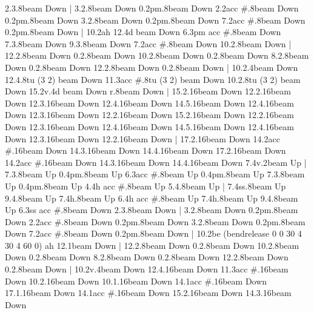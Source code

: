       2.3.8{beam Down}
    |
      3.2.8{beam Down}
      0.2{pm}.8{beam Down}
      2.2{acc #}.8{beam Down}
      0.2{pm}.8{beam Down}
      3.2.8{beam Down}
      0.2{pm}.8{beam Down}
      7.2{acc #}.8{beam Down}
      0.2{pm}.8{beam Down}
    |
      10.2{ah 12}.4{d beam Down}
      6.3{pm acc #}.8{beam Down}
      7.3.8{beam Down}
      9.3.8{beam Down}
      7.2{acc #}.8{beam Down}
      10.2.8{beam Down}
    |
      12.2.8{beam Down}
      0.2.8{beam Down}
      10.2.8{beam Down}
      0.2.8{beam Down}
      8.2.8{beam Down}
      0.2.8{beam Down}
      12.2.8{beam Down}
      0.2.8{beam Down}
    |
      10.2.4{beam Down}
      12.4.8{tu (3 2) beam Down}
      11.3{acc #}.8{tu (3 2) beam Down}
      10.2.8{tu (3 2) beam Down}
      15.2{v}.4{d beam Down}
      r.8{beam Down}
    |
      15.2.16{beam Down}
      12.2.16{beam Down}
      12.3.16{beam Down}
      12.4.16{beam Down}
      14.5.16{beam Down}
      12.4.16{beam Down}
      12.3.16{beam Down}
      12.2.16{beam Down}
      15.2.16{beam Down}
      12.2.16{beam Down}
      12.3.16{beam Down}
      12.4.16{beam Down}
      14.5.16{beam Down}
      12.4.16{beam Down}
      12.3.16{beam Down}
      12.2.16{beam Down}
    |
      17.2.16{beam Down}
      14.2{acc #}.16{beam Down}
      14.3.16{beam Down}
      14.4.16{beam Down}
      17.2.16{beam Down}
      14.2{acc #}.16{beam Down}
      14.3.16{beam Down}
      14.4.16{beam Down}
      7.4{v}.2{beam Up}
    |
      7.3.8{beam Up}
      0.4{pm}.8{beam Up}
      6.3{acc #}.8{beam Up}
      0.4{pm}.8{beam Up}
      7.3.8{beam Up}
      0.4{pm}.8{beam Up}
      4.4{h acc #}.8{beam Up}
      5.4.8{beam Up}
    |
      7.4{ss}.8{beam Up}
      9.4.8{beam Up}
      7.4{h}.8{beam Up}
      6.4{h acc #}.8{beam Up}
      7.4{h}.8{beam Up}
      9.4.8{beam Up}
      6.3{ss acc #}.8{beam Down}
      2.3.8{beam Down}
    |
      3.2.8{beam Down}
      0.2{pm}.8{beam Down}
      2.2{acc #}.8{beam Down}
      0.2{pm}.8{beam Down}
      3.2.8{beam Down}
      0.2{pm}.8{beam Down}
      7.2{acc #}.8{beam Down}
      0.2{pm}.8{beam Down}
    |
      10.2{be (bendrelease 0 0 30 4 30 4 60 0) ah 12}.1{beam Down}
    |
      12.2.8{beam Down}
      0.2.8{beam Down}
      10.2.8{beam Down}
      0.2.8{beam Down}
      8.2.8{beam Down}
      0.2.8{beam Down}
      12.2.8{beam Down}
      0.2.8{beam Down}
    |
      10.2{v}.4{beam Down}
      12.4.16{beam Down}
      11.3{acc #}.16{beam Down}
      10.2.16{beam Down}
      10.1.16{beam Down}
      14.1{acc #}.16{beam Down}
      17.1.16{beam Down}
      14.1{acc #}.16{beam Down}
      15.2.16{beam Down}
      14.3.16{beam Down}
